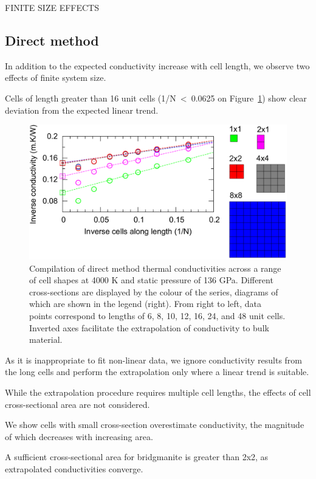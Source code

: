 \documentclass[%
preprint,                                  %
nofootinbib,
 amsmath,amssymb,
 aps,
]{revtex4-1}
\begin{document}
FINITE SIZE EFFECTS


\subsection{\label{sec:results.direct}Direct method}

In addition to the expected conductivity increase with cell length, we observe two effects of finite system size.

Cells of length greater than 16 unit cells (1/N~\textless~0.0625 on Figure~\ref{fig:all_data}) show clear deviation from the expected linear trend.

\begin{figure}[h]
  \includegraphics[width=\linewidth]{images/all_data.png}
  \caption{Compilation of direct method thermal conductivities across a range of cell shapes at 4000 K and static pressure of 136 GPa. Different cross-sections are displayed by the colour of the series, diagrams of which are shown in the legend (right). From right to left, data points correspond to lengths of 6, 8, 10, 12, 16, 24, and 48 unit cells. Inverted axes facilitate the extrapolation of conductivity to bulk material.}
  \label{fig:all_data}
\end{figure}

As it is inappropriate to fit non-linear data, we ignore conductivity results from the long cells and perform the extrapolation only where a linear trend is suitable.

While the extrapolation procedure requires multiple cell lengths, the effects of cell cross-sectional area are not considered. 

We show cells with small cross-section overestimate conductivity, the magnitude of which decreases with increasing area. 

A sufficient cross-sectional area for bridgmanite is greater than 2x2, as extrapolated conductivities converge. 
\end{document}
